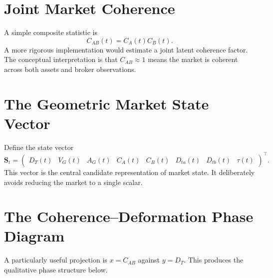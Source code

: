 \documentclass[11pt,a4paper]{article}
\numberwithin{equation}{section}
\begin{document}
\section{Joint Market Coherence}

A simple composite statistic is
\begin{equation}
C_{AB}(t)=C_A(t)C_B(t).
\label{eq:CAB}
\end{equation}
A more rigorous implementation would estimate a joint latent
coherence factor. The conceptual interpretation is that
$C_{AB}\approx1$ means the market is coherent across both assets and
broker observations.

\section{The Geometric Market State Vector}

Define the state vector
\begin{equation}
\mathbf{S}_t=
\begin{pmatrix}
D_T(t)&V_G(t)&A_G(t)&C_A(t)&C_B(t)&D_{ta}(t)&D_{tb}(t)&\tau(t)
\end{pmatrix}^{\!\top}.
\label{eq:state_vector}
\end{equation}
This vector is the central candidate representation of market state.
It deliberately avoids reducing the market to a single scalar.

\section{The Coherence--Deformation Phase Diagram}

A particularly useful projection is $x=C_{AB}$ against $y=D_T$. This
produces the qualitative phase structure below.

\begin{center}
\end{center}
\end{document}
